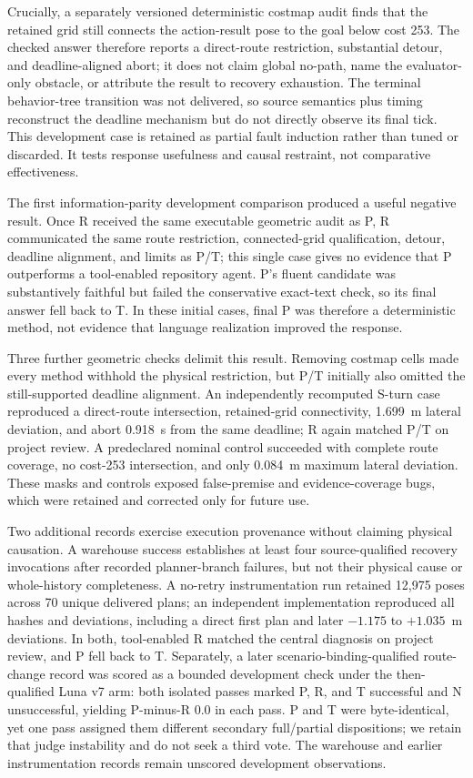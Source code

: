 \documentclass[conference]{IEEEtran}
\begin{document}
Crucially, a separately versioned deterministic costmap audit finds that the retained grid still connects the
action-result pose to the goal below cost 253. The checked answer therefore reports a direct-route
restriction, substantial detour, and deadline-aligned abort; it does not claim global no-path,
name the evaluator-only obstacle, or attribute the result to recovery exhaustion. The terminal
behavior-tree transition was not delivered, so source semantics plus timing reconstruct the
deadline mechanism but do not directly observe its final tick. This development case is retained
as partial fault induction rather than tuned or discarded. It tests response usefulness and
causal restraint, not comparative effectiveness.

The first information-parity development comparison produced a useful negative result. Once R
received the same executable geometric audit as P, R communicated the same route restriction,
connected-grid qualification, detour, deadline alignment, and limits as P/T; this single case gives
no evidence that P outperforms a tool-enabled repository agent. P's fluent candidate was
substantively faithful but failed the conservative exact-text check, so its final answer fell back
to T. In these initial cases, final P was therefore a deterministic method, not evidence that
language realization improved the response.

Three further geometric checks delimit this result. Removing costmap cells made every method
withhold the physical restriction, but P/T initially also omitted the still-supported deadline
alignment. An independently recomputed S-turn case reproduced a direct-route intersection,
retained-grid connectivity, 1.699~m lateral deviation, and abort 0.918~s from the same deadline; R
again matched P/T on project review. A predeclared nominal control succeeded with complete route
coverage, no cost-253 intersection, and only 0.084~m maximum lateral deviation. These masks and
controls exposed false-premise and evidence-coverage bugs, which were retained and corrected only
for future use.

Two additional records exercise execution provenance without claiming physical causation. A
warehouse success establishes at least four source-qualified recovery invocations after recorded
planner-branch failures, but not their physical cause or whole-history completeness. A no-retry
instrumentation run retained 12,975 poses across 70 unique delivered plans; an independent
implementation reproduced all hashes and deviations, including a direct first plan and later
$-1.175$ to $+1.035$~m deviations. In both, tool-enabled R matched the central diagnosis on project
review, and P fell back to T. Separately, a later scenario-binding-qualified route-change record
was scored as a bounded development check under the then-qualified Luna v7 arm: both isolated passes marked P,
R, and T successful and N unsuccessful, yielding P-minus-R 0.0 in each pass. P and T were
byte-identical, yet one pass assigned them different secondary full/partial dispositions; we
retain that judge instability and do not seek a third vote. The warehouse and earlier
instrumentation records remain unscored development observations.
\end{document}
